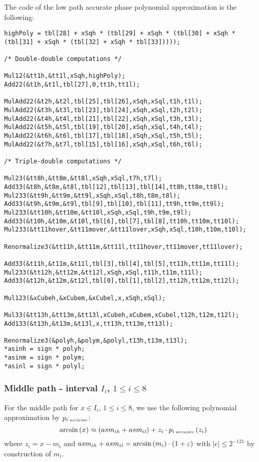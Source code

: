 The code of the low path accurate phase polynomial approximation is
the following:
\begin{lstlisting}[caption={Low path accurate phase polynomial approximation},firstnumber=1]
highPoly = tbl[28] + xSqh * (tbl[29] + xSqh * (tbl[30] + xSqh * (tbl[31] + xSqh * (tbl[32] + xSqh * tbl[33]))));

/* Double-double computations */

Mul12(&tt1h,&tt1l,xSqh,highPoly);
Add22(&t1h,&t1l,tbl[27],0,tt1h,tt1l);

MulAdd22(&t2h,&t2l,tbl[25],tbl[26],xSqh,xSql,t1h,t1l);
MulAdd22(&t3h,&t3l,tbl[23],tbl[24],xSqh,xSql,t2h,t2l);
MulAdd22(&t4h,&t4l,tbl[21],tbl[22],xSqh,xSql,t3h,t3l);
MulAdd22(&t5h,&t5l,tbl[19],tbl[20],xSqh,xSql,t4h,t4l);
MulAdd22(&t6h,&t6l,tbl[17],tbl[18],xSqh,xSql,t5h,t5l);
MulAdd22(&t7h,&t7l,tbl[15],tbl[16],xSqh,xSql,t6h,t6l);

/* Triple-double computations */

Mul23(&tt8h,&tt8m,&tt8l,xSqh,xSql,t7h,t7l);
Add33(&t8h,&t8m,&t8l,tbl[12],tbl[13],tbl[14],tt8h,tt8m,tt8l);
Mul233(&tt9h,&tt9m,&tt9l,xSqh,xSql,t8h,t8m,t8l);
Add33(&t9h,&t9m,&t9l,tbl[9],tbl[10],tbl[11],tt9h,tt9m,tt9l);
Mul233(&tt10h,&tt10m,&tt10l,xSqh,xSql,t9h,t9m,t9l);
Add33(&t10h,&t10m,&t10l,tbl[6],tbl[7],tbl[8],tt10h,tt10m,tt10l);
Mul233(&tt11hover,&tt11mover,&tt11lover,xSqh,xSql,t10h,t10m,t10l);

Renormalize3(&tt11h,&tt11m,&tt11l,tt11hover,tt11mover,tt11lover);

Add33(&t11h,&t11m,&t11l,tbl[3],tbl[4],tbl[5],tt11h,tt11m,tt11l);
Mul233(&tt12h,&tt12m,&tt12l,xSqh,xSql,t11h,t11m,t11l);
Add33(&t12h,&t12m,&t12l,tbl[0],tbl[1],tbl[2],tt12h,tt12m,tt12l);

Mul123(&xCubeh,&xCubem,&xCubel,x,xSqh,xSql);

Mul33(&tt13h,&tt13m,&tt13l,xCubeh,xCubem,xCubel,t12h,t12m,t12l);
Add133(&t13h,&t13m,&t13l,x,tt13h,tt13m,tt13l);

Renormalize3(&polyh,&polym,&polyl,t13h,t13m,t13l);
*asinh = sign * polyh;
*asinm = sign * polym;
*asinl = sign * polyl;
\end{lstlisting}

\subsubsection{Middle path - interval $I_i$, $1 \leq i \leq 8$}
For the middle path for $x \in I_i$, $1 \leq i \leq 8$, we use the
following polynomial approximation by $p_{i \mbox{\tiny ~accurate}}$:
$$\arcsin\left( x \right) \approx \left( asm_{i\mathit{h}} + asm_{i\mathit{l}} \right) +
z_i \cdot p_{i \mbox{\tiny ~accurate}}\left( z_i\right)$$ where $z_i =
x - m_i$ and $asm_{i\mathit{h}} + asm_{i\mathit{l}} = \arcsin\left( m_i \right)
\cdot \left( 1 + \varepsilon \right)$ with $\left \vert \epsilon \right
\vert \leq 2^{-121}$ by construction of $m_i$.

